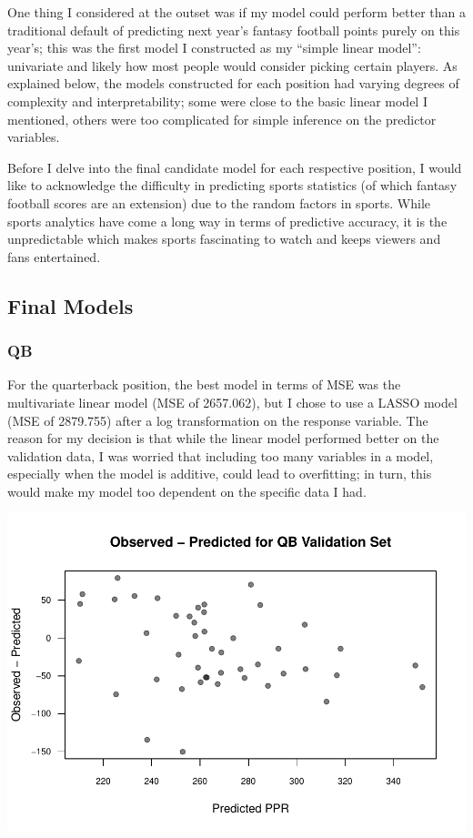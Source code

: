 \documentclass[
]{article}
\begin{document}
One thing I considered at the outset was if my model could perform
better than a traditional default of predicting next year's fantasy
football points purely on this year's; this was the first model I
constructed as my ``simple linear model'': univariate and likely how
most people would consider picking certain players. As explained below,
the models constructed for each position had varying degrees of
complexity and interpretability; some were close to the basic linear
model I mentioned, others were too complicated for simple inference on
the predictor variables.

Before I delve into the final candidate model for each respective
position, I would like to acknowledge the difficulty in predicting
sports statistics (of which fantasy football scores are an extension)
due to the random factors in sports. While sports analytics have come a
long way in terms of predictive accuracy, it is the unpredictable which
makes sports fascinating to watch and keeps viewers and fans
entertained.

\hypertarget{final-models}{%
\subsection{Final Models}\label{final-models}}

\hypertarget{qb}{%
\subsubsection{QB}\label{qb}}

For the quarterback position, the best model in terms of MSE was the
multivariate linear model (MSE of 2657.062), but I chose to use a LASSO
model (MSE of 2879.755) after a log transformation on the response
variable. The reason for my decision is that while the linear model
performed better on the validation data, I was worried that including
too many variables in a model, especially when the model is additive,
could lead to overfitting; in turn, this would make my model too
dependent on the specific data I had.

\begin{center}\includegraphics[width=0.85\linewidth]{stats_199_final_report_files/figure-latex/unnamed-chunk-5-1} \end{center}
\end{document}
